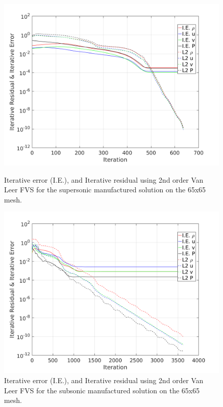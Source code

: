 \documentclass[]{aiaa-tc}%
\begin{document}
\begin{figure}[!htb]
  \centering
  \includegraphics[width=\linewidth]{figures/Iter_SS}
  \caption{Iterative error (I.E.), and Iterative residual using 2nd order Van Leer FVS for the supersonic manufactured solution on the 65x65 mesh.}
  \label{fig:IESS}
  \endminipage\hfill
  \centering
  \includegraphics[width=\linewidth]{figures/Iter_SB}
  \caption{Iterative error (I.E.), and Iterative residual using 2nd order Van Leer FVS for the subsonic manufactured solution on the 65x65 mesh.}
\label{fig:IESB}
  \endminipage\hfill
\end{figure}
\end{document}
